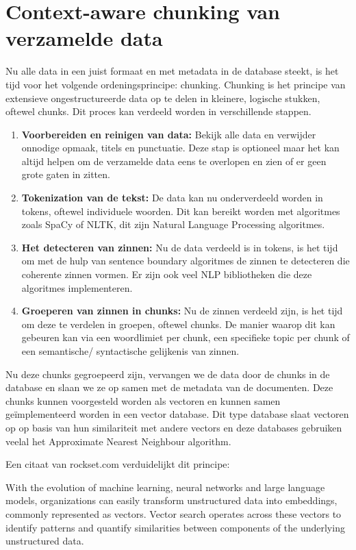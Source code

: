 \chapter{Context-aware chunking van verzamelde data}
Nu alle data in een juist formaat en met metadata in de database steekt, is het tijd voor het volgende ordeningsprincipe: chunking.
Chunking is het principe van extensieve ongestructureerde data op te delen in kleinere, logische stukken, oftewel chunks.
Dit proces kan verdeeld worden in verschillende stappen.

\begin{enumerate}
	\item \textbf{Voorbereiden en reinigen van data:} Bekijk alle data en verwijder onnodige opmaak, titels en punctuatie. Deze stap is optioneel maar het
	      kan altijd helpen om de verzamelde data eens te overlopen en zien of er geen grote gaten in zitten.
	\item \textbf{Tokenization van de tekst:} De data kan nu onderverdeeld worden in tokens, oftewel individuele woorden.
	      Dit kan bereikt worden met algoritmes zoals SpaCy of NLTK,
	      dit zijn Natural Language Processing algoritmes.
	\item \textbf{Het detecteren van zinnen:} Nu de data verdeeld is in tokens, is het tijd om met de hulp van sentence boundary algoritmes de zinnen te
	      detecteren die coherente zinnen vormen. Er zijn ook veel NLP bibliotheken die deze algoritmes implementeren.
	\item \textbf{Groeperen van zinnen in chunks:} Nu de zinnen verdeeld zijn, is het tijd om deze te verdelen in groepen, oftewel chunks.
	      De manier waarop dit kan gebeuren kan via een woordlimiet per chunk, een specifieke topic per chunk of een semantische/ syntactische gelijkenis van zinnen.
\end{enumerate}

Nu deze chunks gegroepeerd zijn, vervangen we de data door de chunks in de database en slaan we ze op samen met de metadata van de documenten.
Deze chunks kunnen voorgesteld worden als vectoren en kunnen samen geïmplementeerd worden in een vector database.
Dit type database slaat vectoren op op basis van hun similariteit met andere vectors en deze databases gebruiken veelal het Approximate Nearest Neighbour algorithm.

Een citaat van rockset.com verduidelijkt dit principe:

\begin{displayquote}
	With the evolution of machine learning, neural networks and large language models, organizations can easily transform unstructured data into embeddings, commonly represented as vectors.
	Vector search operates across these vectors to identify patterns and quantify similarities between components of the underlying unstructured data. 
	\autocite{Rockset}
\end{displayquote}

